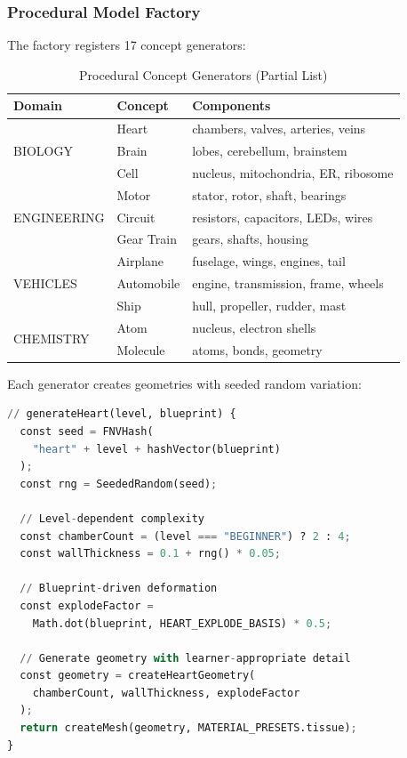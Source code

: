 \documentclass[conference]{IEEEtran}
\begin{document}
\subsubsection{Procedural Model Factory}

The factory registers 17 concept generators:

\begin{table}[h]
\centering
\caption{Procedural Concept Generators (Partial List)}
\label{tab:generators}
\begin{tabular}{llp{3cm}}
\toprule
\textbf{Domain} & \textbf{Concept} & \textbf{Components} \\
\midrule
\multirow{3}{*}{BIOLOGY} & Heart & chambers, valves, arteries, veins \\
 & Brain & lobes, cerebellum, brainstem \\
 & Cell & nucleus, mitochondria, ER, ribosome \\
\midrule
\multirow{3}{*}{ENGINEERING} & Motor & stator, rotor, shaft, bearings \\
 & Circuit & resistors, capacitors, LEDs, wires \\
 & Gear Train & gears, shafts, housing \\
\midrule
\multirow{3}{*}{VEHICLES} & Airplane & fuselage, wings, engines, tail \\
 & Automobile & engine, transmission, frame, wheels \\
 & Ship & hull, propeller, rudder, mast \\
\midrule
\multirow{2}{*}{CHEMISTRY} & Atom & nucleus, electron shells \\
 & Molecule & atoms, bonds, geometry \\
\bottomrule
\end{tabular}
\end{table}

Each generator creates geometries with seeded random variation:

\begin{lstlisting}[language=Python, caption=Procedural Generation Example]
// generateHeart(level, blueprint) {
  const seed = FNVHash(
    "heart" + level + hashVector(blueprint)
  );
  const rng = SeededRandom(seed);
  
  // Level-dependent complexity
  const chamberCount = (level === "BEGINNER") ? 2 : 4;
  const wallThickness = 0.1 + rng() * 0.05;
  
  // Blueprint-driven deformation
  const explodeFactor = 
    Math.dot(blueprint, HEART_EXPLODE_BASIS) * 0.5;
  
  // Generate geometry with learner-appropriate detail
  const geometry = createHeartGeometry(
    chamberCount, wallThickness, explodeFactor
  );
  return createMesh(geometry, MATERIAL_PRESETS.tissue);
}
\end{lstlisting}
\end{document}
